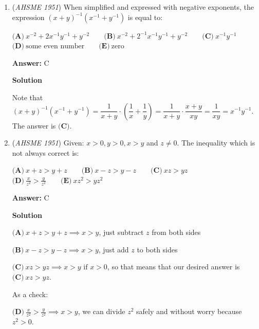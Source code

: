 \begin{enumerate}
We can express any of these types of numbers in the form $\overline{abc}\times 1001$, where $\overline{abc}$ is a 3-digit number. Therefore, the answer is $\textbf{(E)}\ 1001$.

 



\textbf{Solution 2}

$\overline{abcabc}\  = \overline{abc}\* 1001$  .

 


	\item (\textit{AHSME 1951}) When simplified and expressed with negative exponents, the expression $(x+y)^{-1}(x^{-1}+y^{-1})$ is equal to: 


 $\textbf{(A)}\ x^{-2}+2x^{-1}y^{-1}+y^{-2}\qquad\textbf{(B)}\ x^{-2}+2^{-1}x^{-1}y^{-1}+y^{-2}\qquad\textbf{(C)}\ x^{-1}y^{-1}$
$\textbf{(D)}\ \text{some even number}\qquad\textbf{(E)}\ \text{zero}$

 \textbf{Answer: }C



\textbf{Solution}

Note that $(x + y)^{-1}(x^{-1} + y^{-1}) = \dfrac{1}{x + y}\cdot\left(\dfrac{1}{x} + \dfrac{1}{y}\right) = \dfrac{1}{x + y}\cdot\dfrac{x + y}{xy} = \dfrac{1}{xy} = x^{-1}y^{-1}$. The answer is $\textbf{(C)}$.

 


	\item (\textit{AHSME 1951}) Given: $x > 0, y > 0, x > y$ and $z\not = 0$. The inequality which is not always correct is: 


 $\textbf{(A)}\ x+z > y+z\qquad\textbf{(B)}\ x-z > y-z\qquad\textbf{(C)}\ xz > yz$
$\textbf{(D)}\ \frac{x}{z^{2}}>\frac{y}{z^{2}}\qquad\textbf{(E)}\ xz^{2}> yz^{2}$

 \textbf{Answer: }C



\textbf{Solution}

$\textbf{(A)}\ x + z > y + z\implies x>y$, just subtract $z$ from both sides

 $\textbf{(B)}\ x - z > y - z\implies x>y$, just add $z$ to both sides

 $\textbf{(C)}\ xz > yz\implies x>y\text{ if }x>0$, so that means that our desired answer is $\boxed{\textbf{(C)}\ xz > yz}$. 

 As a check:

 $\textbf{(D)}\ \frac {x}{z^2} > \frac {y}{z^2}\implies x>y$, we can divide $z^2$ safely and without worry because $z^2>0$.


\end{enumerate}
